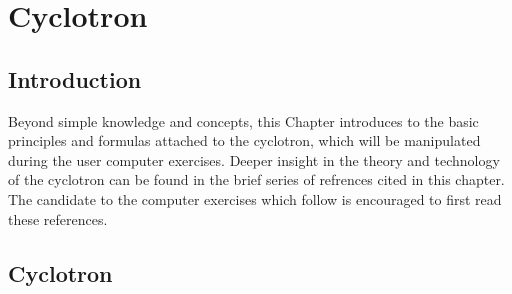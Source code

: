 

\newcommand{\Br}{\ensuremath{B\!\rho}}
\newcommand{\bull}{\ensuremath{\bullet~}}
\newcommand{\Bz}{\ensuremath{{B_z}}}
\newcommand{\com}{\ensuremath{\it com}}
\newcommand{\dip}{{\it DIPOLE}}
\newcommand{\EFB}{\ensuremath{E\!F\!B}}
\newcommand{\EFBs}{\ensuremath{E\!F\!B\!s}}
\newcommand{\ffag}{{\it FFAG}}
\newcommand{\lab}{\ensuremath{lab}}
\newcommand{\MC}{Monte~Carlo}


\chapter[Cyclotron]{Cyclotron}\label{chapCyclotron}


\section{Introduction}\label{secCycloIntro}


Beyond simple knowledge and concepts, this Chapter introduces to the basic principles and formulas attached 
to the cyclotron, 
which will be manipulated during the user computer exercises. 
Deeper insight in the theory and technology 
of the cyclotron 
can be found in the brief series of refrences cited in this chapter. 
The candidate to the computer exercises which follow is encouraged to first read these references. 


\section{Cyclotron \label{secCyclotron}}

